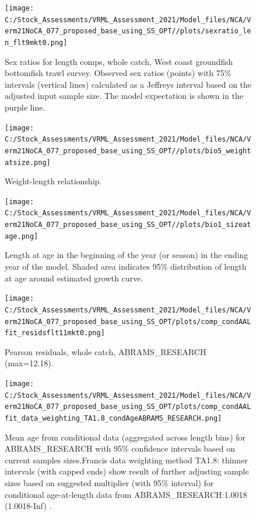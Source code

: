 \documentclass[
  english,
  a4paper,
]{article}
\begin{document}
\begin{figure}
\centering
\texttt{[image: C:/Stock\_Assessments/VRML\_Assessment\_2021/Model\_files/NCA/Verm21NoCA\_077\_proposed\_base\_using\_SS\_OPT//plots/sexratio\_len\_flt9mkt0.png]}
\caption{Sex ratios for length comps, whole catch, West coast groundfish bottomfish trawl survey. Observed sex ratios (points) with 75\% intervals (vertical lines) calculated as a Jeffreys interval based on the adjusted input sample size. The model expectation is shown in the purple line.\label{fig:sexratio-NWFSC-TWL}}
\end{figure}

\FloatBarrier

\begin{figure}
\centering
\texttt{[image: C:/Stock\_Assessments/VRML\_Assessment\_2021/Model\_files/NCA/Verm21NoCA\_077\_proposed\_base\_using\_SS\_OPT//plots/bio5\_weightatsize.png]}
\caption{Weight-length relationship.\label{fig:weightlength}}
\end{figure}

\begin{figure}
\centering
\texttt{[image: C:/Stock\_Assessments/VRML\_Assessment\_2021/Model\_files/NCA/Verm21NoCA\_077\_proposed\_base\_using\_SS\_OPT//plots/bio1\_sizeatage.png]}
\caption{Length at age in the beginning of the year (or season) in the ending year of the model. Shaded area indicates 95\% distribution of length at age around estimated growth curve.\label{fig:fittedgrowth}}
\end{figure}

\FloatBarrier

\FloatBarrier

\begin{figure}
\centering
\texttt{[image: C:/Stock\_Assessments/VRML\_Assessment\_2021/Model\_files/NCA/Verm21NoCA\_077\_proposed\_base\_using\_SS\_OPT/plots/comp\_condAALfit\_residsflt11mkt0.png]}
\caption{Pearson residuals, whole catch, ABRAMS\_RESEARCH (max=12.18).\label{fig:comp_condAALfit_residsflt11mkt0}}
\end{figure}

\begin{figure}
\centering
\texttt{[image: C:/Stock\_Assessments/VRML\_Assessment\_2021/Model\_files/NCA/Verm21NoCA\_077\_proposed\_base\_using\_SS\_OPT/plots/comp\_condAALfit\_data\_weighting\_TA1.8\_condAgeABRAMS\_RESEARCH.png]}
\caption{Mean age from conditional data (aggregated across length bins) for ABRAMS\_RESEARCH with 95\% confidence intervals based on current samples sizes.Francis data weighting method TA1.8: thinner intervals (with capped ends) show result of further adjusting sample sizes based on suggested multiplier (with 95\% interval) for conditional age-at-length data from ABRAMS\_RESEARCH:1.0018 (1.0018-Inf) .\label{fig:comp_condAALfit_data_weighting_TA1.8_condAgeABRAMS_RESEARCH}}
\end{figure}
\end{document}
